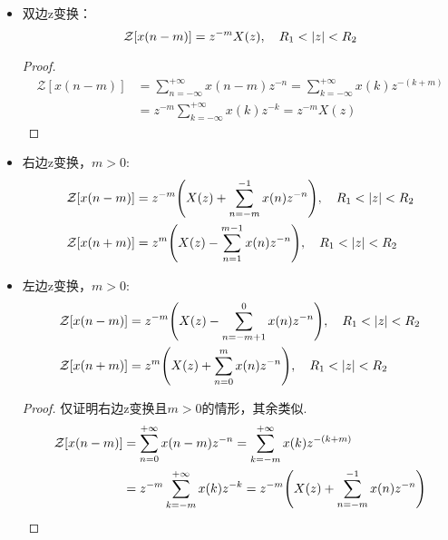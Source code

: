 \documentclass[device=normal, lang=cn]{elegantbook}
\numberwithin{equation}{section}
\begin{document}
\begin{itemize}
    \item 双边z变换：
    \begin{equation}
        \mathcal{Z}[x(n-m)] = z^{-m}X(z), \quad R_1 < \abs{z} < R_2
    \end{equation}
    \begin{proof}
        \begin{equation}
        \begin{aligned}
            \mathcal{Z}[x(n-m)] &= \sum_{n=-\infty}^{+\infty} x(n-m)z^{-n} = \sum_{k=-\infty}^{+\infty} x(k)z^{-(k+m)} \\
            &= z^{-m}\sum_{k=-\infty}^{+\infty} x(k)z^{-k} = z^{-m}X(z)
        \end{aligned}
        \end{equation}
    \end{proof}
    \item 右边z变换，$m > 0$:
    \begin{align}
        \mathcal{Z}[x(n-m)] &= z^{-m}\qty(X(z) + \sum_{n=-m}^{-1} x(n)z^{-n}), \quad R_1 < \abs{z} < R_2 \\ 
        \mathcal{Z}[x(n+m)] &= z^{m}\qty(X(z) - \sum_{n=1}^{m-1} x(n)z^{-n}), \quad R_1 < \abs{z} < R_2
    \end{align}
    \item 左边z变换，$m > 0$:
    \begin{align}
        \mathcal{Z}[x(n-m)] &= z^{-m}\qty(X(z) - \sum_{n=-m+1}^{0} x(n)z^{-n}), \quad R_1 < \abs{z} < R_2 \\ 
        \mathcal{Z}[x(n+m)] &= z^{m}\qty(X(z) + \sum_{n=0}^{m} x(n)z^{-n}), \quad R_1 < \abs{z} < R_2
    \end{align}
    \begin{proof}
        仅证明右边z变换且$m > 0$的情形，其余类似.
        \begin{equation}
        \begin{aligned}
            \mathcal{Z}[x(n-m)] &= \sum_{n=0}^{+\infty} x(n-m)z^{-n} = \sum_{k=-m}^{+\infty} x(k)z^{-(k+m)} \\
            &= z^{-m}\sum_{k=-m}^{+\infty} x(k)z^{-k} = z^{-m}\qty(X(z) + \sum_{n=-m}^{-1} x(n)z^{-n})
        \end{aligned}
        \end{equation}
    \end{proof}
\end{itemize}
\end{document}
